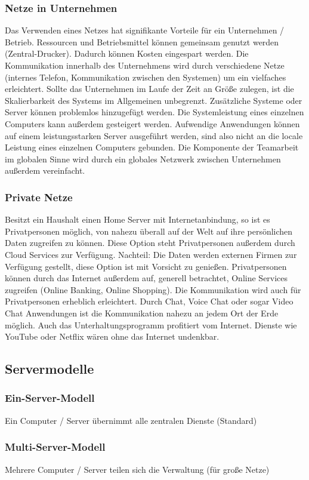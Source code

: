 \documentclass[12pt,a4paper]{article}
\begin{document}
\subsubsection{Netze in Unternehmen}
Das Verwenden eines Netzes hat signifikante Vorteile für ein Unternehmen / Betrieb. Ressourcen und Betriebsmittel können gemeinsam genutzt werden (Zentral-Drucker). Dadurch können Kosten eingespart werden. Die Kommunikation innerhalb des Unternehmens wird durch verschiedene Netze (internes Telefon, Kommunikation zwischen den Systemen) um ein vielfaches erleichtert. Sollte das Unternehmen im Laufe der Zeit an Größe zulegen, ist die Skalierbarkeit des Systems im Allgemeinen unbegrenzt. Zusätzliche Systeme oder Server können problemlos hinzugefügt werden. Die Systemleistung eines einzelnen Computers kann außerdem gesteigert werden. Aufwendige Anwendungen können auf einem leistungsstarken Server ausgeführt werden, sind also nicht an die locale Leistung eines einzelnen Computers gebunden. Die Komponente der Teamarbeit im globalen Sinne wird durch ein globales Netzwerk zwischen Unternehmen außerdem vereinfacht.
\subsubsection{Private Netze}
Besitzt ein Haushalt einen Home Server mit Internetanbindung, so ist es Privatpersonen möglich, von nahezu überall auf der Welt auf ihre persönlichen Daten zugreifen zu können. Diese Option steht Privatpersonen außerdem durch Cloud Services zur Verfügung. Nachteil: Die Daten werden externen Firmen zur Verfügung gestellt, diese Option ist mit Vorsicht zu genießen. Privatpersonen können durch das Internet außerdem auf, generell betrachtet, Online Services zugreifen (Online Banking, Online Shopping). Die Kommunikation wird auch für Privatpersonen erheblich erleichtert. Durch Chat, Voice Chat oder sogar Video Chat Anwendungen ist die Kommunikation nahezu an jedem Ort der Erde möglich. Auch das Unterhaltungsprogramm profitiert vom Internet. Dienste wie YouTube oder Netflix wären ohne das Internet undenkbar.
\subsection{Servermodelle}
\subsubsection{Ein-Server-Modell}
Ein Computer / Server übernimmt alle zentralen Dienste (Standard)
\subsubsection{Multi-Server-Modell}
Mehrere Computer / Server teilen sich die Verwaltung (für große Netze)
\end{document}
